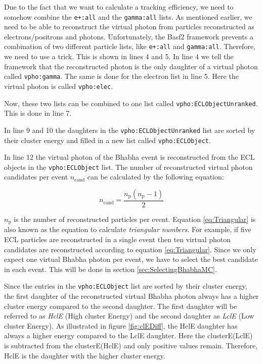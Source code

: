 \documentclass[a4paper,11pt,twosided,final,german,openbib,pdftex,listof=totoc,bibliography=totoc]{scrbook}
\begin{document}
Due to the fact that we want to calculate a tracking efficiency, we need to somehow combine the \texttt{e+:all} and the \texttt{gamma:all} lists. As mentioned earlier, we need to be able to reconstruct the virtual photon from particles reconstructed as electrons/positrons and photons.
Unfortunately, the Basf2 framework prevents a combination of two different particle lists, like \texttt{e+:all} and \texttt{gamma:all}. Therefore, we need to use a trick. This is shown in lines 4 and 5. In line 4 we tell the framework that the reconstructed photon is the only daughter of a virtual photon called \texttt{vpho:gamma}. The same is done for the electron list in line 5. Here the virtual photon is called \texttt{vpho:elec}. 

Now, these two lists can be combined to one list called \texttt{vpho:ECLObjectUnranked}. This is done in line 7.

In line 9 and 10 the daughters in the \texttt{vpho:ECLObjectUnranked} list are sorted by their cluster energy and filled in a new list called \texttt{vpho:ECLObject}.

In line 12 the virtual photon of the Bhabha event is reconstructed from the ECL objects in the \texttt{vpho:ECLObject} list. The number of reconstructed virtual photon candidates per event $n_{\textrm{cand}}$ can be calculated by the following equation\cite{triangular}:

\begin{equation}
n_{\textrm{cand}} = \frac{n_{\textrm{p}}(n_{\textrm{p}} -1)}{2}
\label{eq:Triangular}
\end{equation}

$n_{\textrm{p}}$ is the number of reconstructed particles per event. Equation \ref{eq:Triangular} is also known as the equation to calculate \textit{triangular numbers}. For example, if five ECL particles are reconstructed in a single event then ten virtual photon candidates are reconstructed according to equation \ref{eq:Triangular}. Since we only expect one virtual Bhabha photon per event, we have to select the best candidate in each event. This will be done in section \ref{sec:SelectingBhabhaMC}.

Since the entries in the \texttt{vpho:ECLObject} list are sorted by their cluster energy, the first daughter of the reconstructed virtual Bhabha photon always has a higher cluster energy compared to the second daughter. The first daughter will be referred to as \textit{HclE} (High cluster Energy) and the second daughter as \textit{LclE} (Low cluster Energy). As illustrated in figure \ref{fig:clEDiff}, the HclE daughter has always a higher energy compared to the LclE daughter. Here the clusterE(LclE) is subtracted from the clusterE(HclE) and only positive values remain. Therefore, HclE is the daughter with the higher cluster energy.
\end{document}

